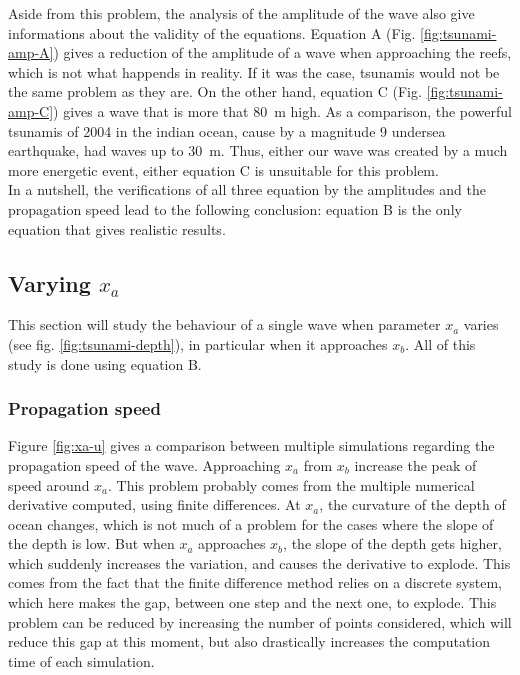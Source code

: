 \documentclass[a4paper,12pt,twoside]{article}
\begin{document}
      Aside from this problem, the analysis of the amplitude of the wave also give informations about the validity of the equations.
      Equation A (Fig. \ref{fig:tsunami-amp-A}) gives a reduction of the amplitude of a wave when approaching the reefs, which is not what happends in reality.
      If it was the case, tsunamis would not be the same problem as they are.
      On the other hand, equation C (Fig. \ref{fig:tsunami-amp-C}) gives a wave that is more that \SI{80}{\meter} high.
      As a comparison, the powerful tsunamis of 2004 in the indian ocean, cause by a magnitude 9 undersea earthquake, had waves up to \SI{30}{\meter}. \cite{wiki:tsunami-2004}
      Thus, either our wave was created by a much more energetic event, either equation C is unsuitable for this problem.\\

      In a nutshell, the verifications of all three equation by the amplitudes and the propagation speed lead to the following conclusion: equation B is the only equation that gives realistic results.


      \subsection{Varying $x_a$} \label{sec:var-xa}
      This section will study the behaviour of a single wave when parameter $x_a$ varies (see fig. \ref{fig:tsunami-depth}), in particular when it approaches $x_b$.
      All of this study is done using equation B.

      \subsubsection{Propagation speed}
        Figure \ref{fig:xa-u} gives a comparison between multiple simulations regarding the propagation speed of the wave.
        Approaching $x_a$ from $x_b$ increase the peak of speed around $x_a$.
        This problem probably comes from the multiple numerical derivative computed, using finite differences.
        At $x_a$, the curvature of the depth of ocean changes, which is not much of a problem for the cases where the slope of the depth is low.
        But when $x_a$ approaches $x_b$, the slope of the depth gets higher, which suddenly increases the variation, and causes the derivative to explode.
        This comes from the fact that the finite difference method relies on a discrete system, which here makes the gap, between one step and the next one, to explode.
        This problem can be reduced by increasing the number of points considered, which will reduce this gap at this moment, but also drastically increases the computation time of each simulation.
\end{document}
